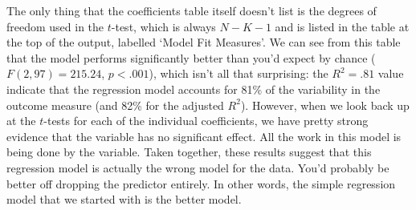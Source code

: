 The only thing that the coefficients table itself doesn't list is the degrees of freedom used in the $t$-test, which is always $N-K-1$ and is listed in the table at the top of the output, labelled `Model Fit Measures'. We can see from this table that the model performs significantly better than you'd expect by chance ($F(2,97) = 215.24$, $p<.001$), which isn't all that surprising: the $R^2 = .81$ value indicate that the regression model accounts for 81\% of the variability in the outcome measure (and 82\% for the adjusted $R^2$). However, when we look back up at the $t$-tests for each of the individual coefficients, we have pretty strong evidence that the  variable has no significant effect. All the work in this model is being done by the  variable. Taken together, these results suggest that this regression model is actually the wrong model for the data. You'd probably be better off dropping the  predictor entirely. In other words, the simple regression model that we started with is the better model.


